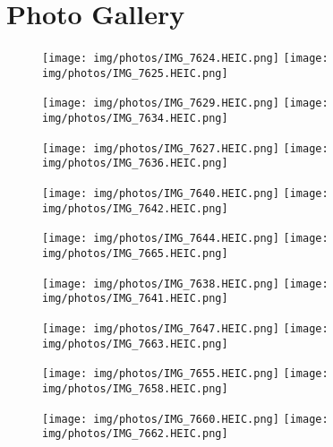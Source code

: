 \section{Photo Gallery}
\vspace{2em}
\begin{figure}[h]
  \centering
    \texttt{[image: img/photos/IMG\_7624.HEIC.png]}\hspace{5em}
    \texttt{[image: img/photos/IMG\_7625.HEIC.png]}

    \vspace{1em}
    \texttt{[image: img/photos/IMG\_7629.HEIC.png]}\hspace{5em}
    \texttt{[image: img/photos/IMG\_7634.HEIC.png]}

    \vspace{1em}
    \texttt{[image: img/photos/IMG\_7627.HEIC.png]}\hspace{5em}
    \texttt{[image: img/photos/IMG\_7636.HEIC.png]}
\end{figure}

\newpage
\begin{figure}[h]
  \centering
    \texttt{[image: img/photos/IMG\_7640.HEIC.png]}\hspace{5em}
    \texttt{[image: img/photos/IMG\_7642.HEIC.png]}

    \vspace{1em}
    \texttt{[image: img/photos/IMG\_7644.HEIC.png]}\hspace{5em}
    \texttt{[image: img/photos/IMG\_7665.HEIC.png]}

    \vspace{1em}
    \texttt{[image: img/photos/IMG\_7638.HEIC.png]}\hspace{5em}
    \texttt{[image: img/photos/IMG\_7641.HEIC.png]}
\end{figure}

\begin{figure}[h]
  \centering
    \texttt{[image: img/photos/IMG\_7647.HEIC.png]}\hspace{5em}
    \texttt{[image: img/photos/IMG\_7663.HEIC.png]}

    \vspace{5em}
    \texttt{[image: img/photos/IMG\_7655.HEIC.png]}\hspace{5em}
    \texttt{[image: img/photos/IMG\_7658.HEIC.png]}

    \vspace{2em}
    \texttt{[image: img/photos/IMG\_7660.HEIC.png]}\hspace{5em}
    \texttt{[image: img/photos/IMG\_7662.HEIC.png]}
\end{figure}